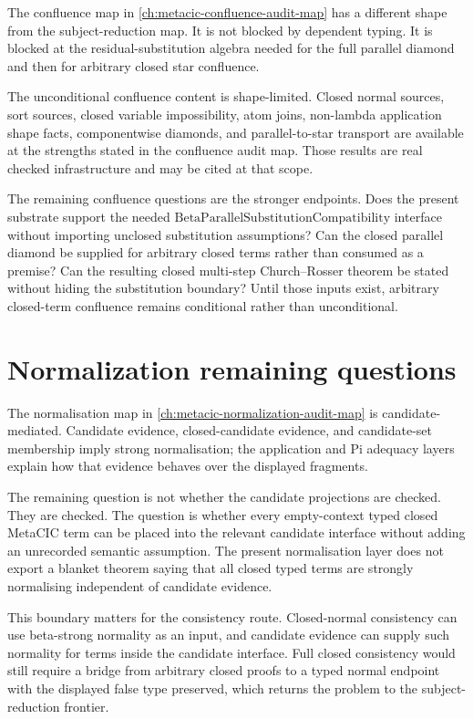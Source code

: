 The confluence map in \autoref{ch:metacic-confluence-audit-map} has a different
shape from the subject-reduction map. It is not blocked by dependent typing.
It is blocked at the residual-substitution algebra needed for the full
parallel diamond and then for arbitrary closed star confluence.

The unconditional confluence content is shape-limited. Closed normal sources,
sort sources, closed variable impossibility, atom joins, non-lambda application
shape facts, componentwise diamonds, and parallel-to-star transport are
available at the strengths stated in the confluence audit map. Those results
are real checked infrastructure and may be cited at that scope.

The remaining confluence questions are the stronger endpoints. Does the present
substrate support the needed
$\mathrm{BetaParallelSubstitutionCompatibility}$ interface without importing
unclosed substitution assumptions? Can the closed parallel diamond be supplied
for arbitrary closed terms rather than consumed as a premise? Can the resulting
closed multi-step Church--Rosser theorem be stated without hiding the
substitution boundary? Until those inputs exist, arbitrary closed-term
confluence remains conditional rather than unconditional.

\section{Normalization remaining questions}
\label{sec:metacic-open-problems-normalization}

The normalisation map in \autoref{ch:metacic-normalization-audit-map} is
candidate-mediated. Candidate evidence, closed-candidate evidence, and
candidate-set membership imply strong normalisation; the application and Pi
adequacy layers explain how that evidence behaves over the displayed
fragments.

The remaining question is not whether the candidate projections are checked.
They are checked. The question is whether every empty-context typed closed
MetaCIC term can be placed into the relevant candidate interface without adding
an unrecorded semantic assumption. The present normalisation layer does not
export a blanket theorem saying that all closed typed terms are strongly
normalising independent of candidate evidence.

This boundary matters for the consistency route. Closed-normal consistency can
use beta-strong normality as an input, and candidate evidence can supply such
normality for terms inside the candidate interface. Full closed consistency
would still require a bridge from arbitrary closed proofs to a typed normal
endpoint with the displayed false type preserved, which returns the problem to
the subject-reduction frontier.


